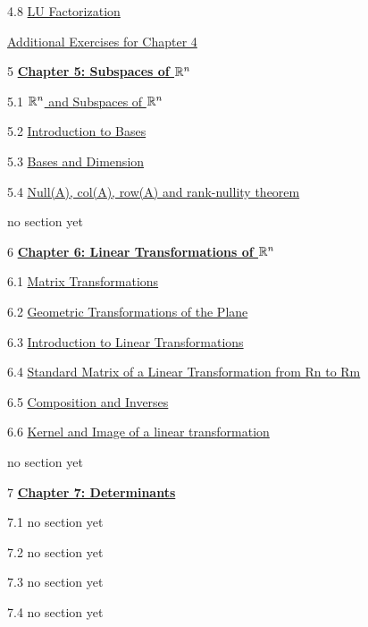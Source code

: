 \documentclass{ximera}
\begin{document}
4.8	\href{https://ximera.osu.edu/oerlinalg/LinearAlgebra/MAT-0070/main}{LU Factorization}
	
	\href{https://ximera.osu.edu/oerlinalg/LinearAlgebra/SUPX-0040/main}{Additional Exercises for Chapter 4}
	
5	\href{https://ximera.osu.edu/oerlinalg/LinearAlgebra/XLAChapter_subspacesRn/main}{\textbf{Chapter 5: Subspaces of $\mathbb{R}^n$}}
	
5.1	\href{https://ximera.osu.edu/oerlinalg/LinearAlgebra/VSP-0020/main}{$\mathbb{R}^n$ and Subspaces of $\mathbb{R}^n$}
	
5.2	\href{https://ximera.osu.edu/oerlinalg/LinearAlgebra/VSP-0030/main}{Introduction to Bases}
	
5.3	\href{https://ximera.osu.edu/oerlinalg/LinearAlgebra/VSP-0035/main}{Bases and Dimension}
	
5.4	\href{https://ximera.osu.edu/oerlinalg/LinearAlgebra/VSP-0040/main}{Null(A), col(A), row(A) and rank-nullity theorem}
	
	no section yet
	
6	\href{https://ximera.osu.edu/oerlinalg/LinearAlgebra/XLAChapter_linTrans/main}{\textbf{Chapter 6: Linear Transformations of $\mathbb{R}^n$}}
	
6.1	\href{https://ximera.osu.edu/oerlinalg/LinearAlgebra/LTR-0005/main}{Matrix Transformations}
	
6.2	\href{https://ximera.osu.edu/oerlinalg/LinearAlgebra/LTR-0070/main}{Geometric Transformations of the Plane}
	
6.3	\href{https://ximera.osu.edu/oerlinalg/LinearAlgebra/LTR-0010/main}{Introduction to Linear Transformations}
	
6.4	\href{https://ximera.osu.edu/oerlinalg/LinearAlgebra/LTR-0020/main}{Standard Matrix of a Linear Transformation from Rn to Rm}
	
6.5	\href{https://ximera.osu.edu/oerlinalg/LinearAlgebra/LTR-0030/main}{Composition and Inverses}
	
6.6	\href{https://ximera.osu.edu/oerlinalg/LinearAlgebra/LTR-0050/main}{Kernel and Image of a linear transformation}
	
	no section yet
	
7	\href{https://ximera.osu.edu/oerlinalg/LinearAlgebra/XLAChapter_det/main}{\textbf{Chapter 7: Determinants}}
	
7.1	no section yet
	
7.2	no section yet
	
7.3	no section yet
	
7.4	no section yet
	
\end{document}
